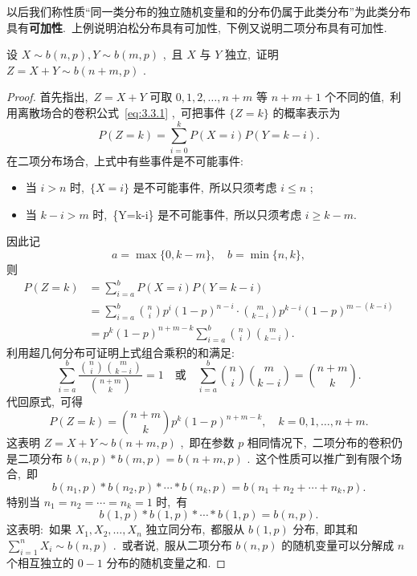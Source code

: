    以后我们称性质“同一类分布的独立随机变量和的分布仍属于此类分布”为此类分布具有{\bfseries 可加性}.\ 上例说明泊松分布具有可加性,\ 下例又说明二项分布具有可加性.
   \begin{example}[二项分布的可加性]\label{exam:3.3.3}
   	设 $X\sim b(n,p),Y\sim b(m,p)$ ,\ 且 $X$ 与 $Y$ 独立,\ 证明 $Z=X+Y\sim b(n+m,p)$ .
   	\begin{proof}
   		首先指出,\ $Z=X+Y$ 可取 $0,1,2,\ldots,n+m$ 等 $n+m+1$ 个不同的值,\ 利用离散场合的卷积公式~\ref{eq:3.3.1} ,\ 可把事件 $\{Z=k\}$ 的概率表示为
   		\begin{equation*}
   			P(Z=k)=\sum_{i=0}^{k}P(X=i)P(Y=k-i).
   		\end{equation*}
   		在二项分布场合,\ 上式中有些事件是不可能事件:
   		\begin{itemize}
   			\item 当 $i>n$ 时,\ $\{X=i\}$ 是不可能事件,\ 所以只须考虑 $i\leqslant n$ ;
   			\item 当 $k-i>m$ 时,\ \{Y=k-i\} 是不可能事件,\ 所以只须考虑 $i\geqslant k-m$.
   		\end{itemize}
   		因此记
   		\begin{equation*}
   			a=\max\{0,k-m\},\quad b=\min\{n,k\},
   		\end{equation*}
   		则
   		\begin{align*}
   			P(Z=k)
   			&= \sum_{i=a}^{b}P(X=i)P(Y=k-i)\\
   			&= \sum_{i=a}^{b}\binom{n}{i}p^{i}(1-p)^{n-i}\cdot\binom{m}{k-i}p^{k-i}(1-p)^{m-(k-i)}\\
   			&= p^{k}(1-p)^{n+m-k}\sum_{i=a}^{b}\binom{n}{i}\binom{m}{k-i}.
   		\end{align*}
   		利用超几何分布可证明上式组合乘积的和满足:
   		\begin{equation*}
   			\sum_{i=a}^{b}\frac{\displaystyle\binom{n}{i}\binom{m}{k-i}}{\displaystyle\binom{n+m}{k}}=1\quad\text{或}\quad\sum_{i=a}^{b}\binom{n}{i}\binom{m}{k-i}=\binom{n+m}{k}.
   		\end{equation*}
   		代回原式,\ 可得
   		\begin{equation*}
   			P(Z=k)=\binom{n+m}{k}p^k(1-p)^{n+m-k},\quad k=0,1,\ldots,n+m.
   		\end{equation*}
   		这表明 $Z=X+Y\sim b(n+m,p)$ ,\ 即在参数 $p$ 相同情况下,\ 二项分布的卷积仍是二项分布 $b(n,p)\ast b(m,p)=b(n+m,p)$ .\ 这个性质可以推广到有限个场合,\ 即
   		\begin{equation}
   			b(n_1,p)\ast b(n_2,p)\ast\cdots\ast b(n_k,p)=b(n_1+n_2+\cdots+n_k,p).\label{eq:3.3.5}
   		\end{equation}
   		特别当 $n_1=n_2=\cdots=n_k=1$ 时,\ 有
   		\begin{equation}
   			b(1,p)\ast b(1,p)\ast \cdots\ast b(1,p)=b(n,p).\label{eq:3.3.6}
   		\end{equation}
   		这表明:\ 如果 $X_1,X_2,\ldots,X_n$ 独立同分布,\ 都服从 $b(1,p)$ 分布,\ 即其和 $\displaystyle\sum_{i=1}^{n}X_i\sim b(n,p)$ .\ 或者说,\ 服从二项分布 $b(n,p)$ 的随机变量可以分解成 $n$ 个相互独立的 $0-1$ 分布的随机变量之和.
   	\end{proof}
   \end{example}
   
